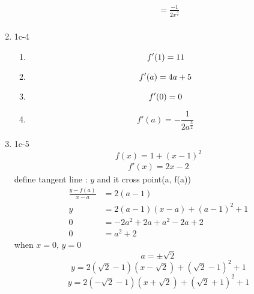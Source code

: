 \documentclass{article}
\begin{document}
\begin{enumerate}
\begin{enumerate}
\begin{align*}
            &= \frac{-1}{2x^\frac{3}{2}} \\ 
        \end{align*}
    \end{enumerate}
\item 1c-4
    \begin{enumerate}
        \item 
        \begin{equation*}
            f'(1) = 11 \\
        \end{equation*}
        \item 
        \begin{equation*}
            f'(a) = 4a+5 \\
        \end{equation*}
        \item 
        \begin{equation*}
            f'(0) = 0 \\
        \end{equation*}
        \item 
        \begin{equation*}
            f'(a) = -\frac{1}{2a^\frac{3}{2}}
        \end{equation*}
    \end{enumerate}
\item 1c-5
    \begin{equation*}
        f(x) = 1 + (x-1)^2
    \end{equation*}
    \begin{align*}
        f'(x) = 2x - 2
    \end{align*}
    define tangent line : $y$ and it cross point(a, f(a))
    \begin{align*}
        \frac{y - f(a)}{x - a} &= 2(a-1) \\
       y &= 2(a-1)(x-a) + (a-1)^2 + 1 \\
       0 &= -2a^2 + 2a + a^2 -2a + 2 \\
       0 &= a^2 + 2
    \end{align*}
    when $x = 0$, $y = 0$
    \begin{equation*}
        a = \pm\sqrt{2}
    \end{equation*}
    \begin{equation*}
        y = 2(\sqrt{2} - 1)(x-\sqrt{2}) + (\sqrt{2} - 1)^2 + 1
    \end{equation*}
    \begin{equation*}
        y = 2(-\sqrt{2} - 1)(x+\sqrt{2}) + (\sqrt{2} + 1)^2 + 1
    \end{equation*}
\end{enumerate}
\end{document}
